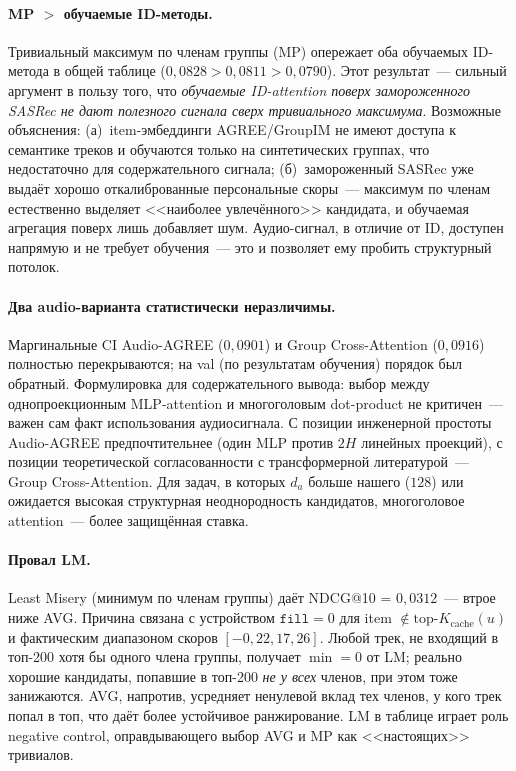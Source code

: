 \paragraph{MP $>$ обучаемые ID-методы.} Тривиальный максимум по членам группы (MP) опережает оба обучаемых ID-метода в общей таблице ($0{,}0828 > 0{,}0811 > 0{,}0790$). Этот результат~--- сильный аргумент в пользу того, что \emph{обучаемые ID-attention поверх замороженного SASRec не дают полезного сигнала сверх тривиального максимума}. Возможные объяснения: (а)~item-эмбеддинги AGREE/GroupIM не имеют доступа к семантике треков и обучаются только на синтетических группах, что недостаточно для содержательного сигнала; (б)~замороженный SASRec уже выдаёт хорошо откалиброванные персональные скоры~--- максимум по членам естественно выделяет <<наиболее увлечённого>> кандидата, и обучаемая агрегация поверх лишь добавляет шум. Аудио-сигнал, в отличие от ID, доступен напрямую и не требует обучения~--- это и позволяет ему пробить структурный потолок.

\paragraph{Два audio-варианта статистически неразличимы.} Маргинальные CI Audio-AGREE ($0{,}0901$) и Group Cross-Attention ($0{,}0916$) полностью перекрываются; на val (по результатам обучения) порядок был обратный. Формулировка для содержательного вывода: выбор между однопроекционным MLP-attention и многоголовым dot-product не критичен~--- важен сам факт использования аудиосигнала. С позиции инженерной простоты Audio-AGREE предпочтительнее (один MLP против $2H$ линейных проекций), с позиции теоретической согласованности с трансформерной литературой~--- Group Cross-Attention. Для задач, в которых $d_a$ больше нашего ($128$) или ожидается высокая структурная неоднородность кандидатов, многоголовое attention~--- более защищённая ставка.

\paragraph{Провал LM.} Least Misery (минимум по членам группы) даёт NDCG@10 = $0{,}0312$~--- втрое ниже AVG. Причина связана с устройством $\mathtt{fill} = 0$ для item $\notin \mathrm{top}\text{-}K_{\mathrm{cache}}(u)$ и фактическим диапазоном скоров $[-0{,}22, 17{,}26]$. Любой трек, не входящий в топ-200 хотя бы одного члена группы, получает $\min = 0$ от LM; реально хорошие кандидаты, попавшие в топ-200 \emph{не у всех} членов, при этом тоже занижаются. AVG, напротив, усредняет ненулевой вклад тех членов, у кого трек попал в топ, что даёт более устойчивое ранжирование. LM в таблице играет роль negative control, оправдывающего выбор AVG и MP как <<настоящих>> тривиалов.


